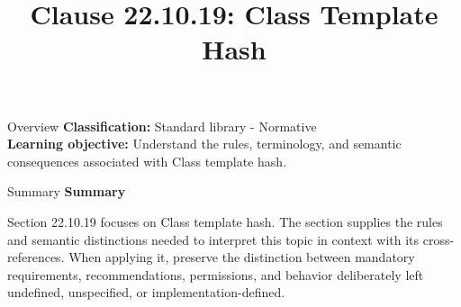 \documentclass[10pt,letterpaper]{article}
\title{Clause 22.10.19: Class Template Hash}
\author{}
\date{}
\begin{document}
\maketitle
\begin{CornellOverviewBox}{Overview}
\textbf{Classification:} Standard library - Normative\\[2pt]
\textbf{Learning objective:} Understand the rules, terminology, and semantic consequences associated with Class template hash.
\end{CornellOverviewBox}\begin{CornellSummaryBox}{Summary}
{\sffamily\bfseries\color{Accent} Summary}\par\vspace{3pt}Section 22.10.19 focuses on Class template hash. The section supplies the rules and semantic distinctions needed to interpret this topic in context with its cross-references. When applying it, preserve the distinction between mandatory requirements, recommendations, permissions, and behavior deliberately left undefined, unspecified, or implementation-defined.
\end{CornellSummaryBox}
\end{document}
